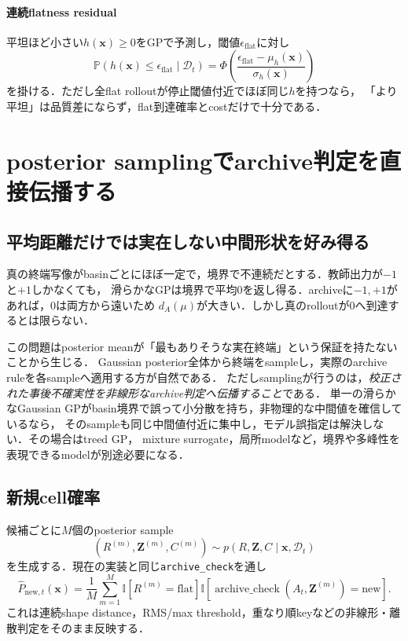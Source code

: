 \documentclass[a4paper,11pt]{ltjsarticle}
\newcommand{\Pp}{\mathbb P}
\newcommand{\D}{\mathcal D}
\newcommand{\ind}{\mathbb I}
\newcommand{\code}[1]{\nolinkurl{#1}}
\begin{document}
\paragraph{連続flatness residual}
平坦ほど小さい\(h(\bm x)\geq0\)をGPで予測し，閾値\(\epsilon_{\mathrm{flat}}\)に対し
\begin{equation}
  \Pp(h(\bm x)\leq\epsilon_{\mathrm{flat}}\mid\D_t)
  =\Phi\left(
  \frac{\epsilon_{\mathrm{flat}}-\mu_h(\bm x)}{\sigma_h(\bm x)}
  \right)
  \label{eq:flatness-probability}
\end{equation}
を掛ける．ただし全flat rolloutが停止閾値付近でほぼ同じ\(h\)を持つなら，
「より平坦」は品質差にならず，flat到達確率とcostだけで十分である．

\section{posterior samplingでarchive判定を直接伝播する}
\label{sec:posterior-archive-sampling}

\subsection{平均距離だけでは実在しない中間形状を好み得る}

真の終端写像がbasinごとにほぼ一定で，境界で不連続だとする．教師出力が\(-1\)と\(+1\)しかなくても，
滑らかなGPは境界で平均0を返し得る．archiveに\(-1,+1\)があれば，0は両方から遠いため
\(d_A(\mu)\)が大きい．しかし真のrolloutが0へ到達するとは限らない．

この問題はposterior meanが「最もありそうな実在終端」という保証を持たないことから生じる．
Gaussian posterior全体から終端をsampleし，実際のarchive ruleを各sampleへ適用する方が自然である．
ただしsamplingが行うのは，\emph{校正された事後不確実性を非線形なarchive判定へ伝播すること}である．
単一の滑らかなGaussian GPがbasin境界で誤って小分散を持ち，非物理的な中間値を確信しているなら，
そのsampleも同じ中間値付近に集中し，モデル誤指定は解決しない．その場合はtreed GP，
mixture surrogate，局所modelなど，境界や多峰性を表現できるmodelが別途必要になる．

\subsection{新規cell確率}

候補ごとに\(M\)個のposterior sample
\begin{equation}
  (R^{(m)},\bm Z^{(m)},C^{(m)})
  \sim p(R,\bm Z,C\mid\bm x,\D_t)
\end{equation}
を生成する．現在の実装と同じ\code{archive\_check}を通し
\begin{equation}
  \boxed{
  \widehat P_{\mathrm{new},t}(\bm x)
  =\frac1M\sum_{m=1}^M
  \ind[R^{(m)}=\mathrm{flat}]
  \ind[\operatorname{archive\_check}(A_t,\bm Z^{(m)})=\mathrm{new}].}
  \label{eq:mc-new-cell-probability}
\end{equation}
これは連続shape distance，RMS/max threshold，重なり順keyなどの非線形・離散判定をそのまま反映する．
\end{document}
